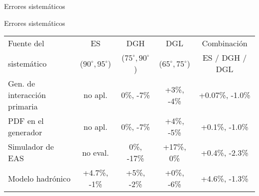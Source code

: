 \begin{frame}{Errores sistem\'aticos}
	\begin{block}{Errores sistem\'aticos}
		\begin{center}
			\renewcommand{\arraystretch}{1.4}
			\scriptsize
				\begin{tabular}{|C{0.2\textwidth}|c|c|c|c|}
				\hline
				Fuente del  & ES        & DGH       & DGL        & Combinaci\'on         \\
				sistemático & ($90^\circ,95^\circ$) & ($75^\circ,90^\circ$) & ($65^\circ,75^\circ$) & ES / DGH / DGL   \\
				\hline
				
				Gen. de interacción primaria    &  no apl. &   0\%, -7\%     &   +3\%, -4\%  & +0.07\%, -1.0\% \\
				
				\hline
				
				PDF en el generador             &  no apl. &   0\%, -7\%     &   +4\%, -5\%  & +0.1\%, -1.0\% \\
				
				\hline
				
				Simulador de EAS                &  no eval. &   0\%, -17\%    &   +17\%, 0\%  & +0.4\%, -2.3\% \\
				
				\hline
				
				Modelo hadrónico                & +4.7\%, -1\%      &  +5\%, -2\%     &   +0\%, -6\%  & +4.6\%, -1.3\% \\
				

\end{tabular}
\end{center}
\end{block}
\end{frame}
